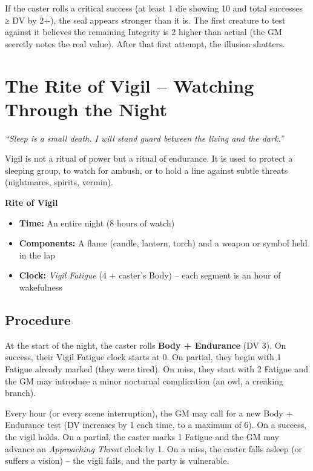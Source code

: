\documentclass[10pt,a5paper]{book}
\begin{document}
If the caster rolls a critical success (at least 1 die showing 10 and total successes ≥ DV by 2+), the seal appears stronger than it is. The first creature to test against it believes the remaining Integrity is 2 higher than actual (the GM secretly notes the real value). After that first attempt, the illusion shatters.

\clearpage

\section{The Rite of Vigil – Watching Through the Night}

\textit{“Sleep is a small death. I will stand guard between the living and the dark.”}

Vigil is not a ritual of power but a ritual of endurance. It is used to protect a sleeping group, to watch for ambush, or to hold a line against subtle threats (nightmares, spirits, vermin).

\begin{tcolorbox}[colback=blue!5, colframe=blue!70]
\textbf{Rite of Vigil}
\begin{itemize}
    \item \textbf{Time:} An entire night (8 hours of watch)
    \item \textbf{Components:} A flame (candle, lantern, torch) and a weapon or symbol held in the lap
    \item \textbf{Clock:} \textit{Vigil Fatigue} (4 + caster’s Body) – each segment is an hour of wakefulness
\end{itemize}
\end{tcolorbox}

\subsection*{Procedure}

At the start of the night, the caster rolls \textbf{Body + Endurance} (DV 3). On success, their Vigil Fatigue clock starts at 0. On partial, they begin with 1 Fatigue already marked (they were tired). On miss, they start with 2 Fatigue and the GM may introduce a minor nocturnal complication (an owl, a creaking branch).

Every hour (or every scene interruption), the GM may call for a new Body + Endurance test (DV increases by 1 each time, to a maximum of 6). On a success, the vigil holds. On a partial, the caster marks 1 Fatigue and the GM may advance an \textit{Approaching Threat} clock by 1. On a miss, the caster falls asleep (or suffers a vision) – the vigil fails, and the party is vulnerable.
\end{document}
